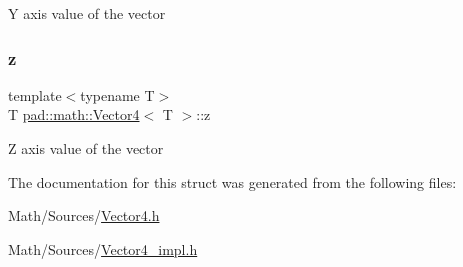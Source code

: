 Y axis value of the vector \mbox{\label{structpad_1_1math_1_1_vector4_a9407faaccb5b094aeb3cadc36e71755e}} 
\subsubsection{\texorpdfstring{z}{z}}
{\footnotesize\ttfamily template$<$typename T$>$ \\
T \mbox{\hyperlink{structpad_1_1math_1_1_vector4}{pad\+::math\+::\+Vector4}}$<$ T $>$\+::z}

Z axis value of the vector 

The documentation for this struct was generated from the following files\+:\begin{DoxyCompactItemize}
\item 
Math/\+Sources/\mbox{\hyperlink{_vector4_8h}{Vector4.\+h}}\item 
Math/\+Sources/\mbox{\hyperlink{_vector4__impl_8h}{Vector4\+\_\+impl.\+h}}\end{DoxyCompactItemize}
